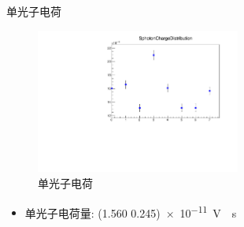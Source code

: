 \documentclass[10pt]{beamer}
\begin{document}
\begin{frame}[label={sec:org5fe9613}]{单光子电荷}
\begin{figure}[htbp]
\centering
\includegraphics[width=0.6\textwidth]{../../DetectorPerform/SPhoton/SphotonCharge.pdf}
\caption{单光子电荷}
\end{figure}

\begin{itemize}
\item 单光子电荷量: (1.560 \textpm{} 0.245)\texttimes{}\qty{e-11}{V\cdot s}
\end{itemize}
\end{frame}
\end{document}
